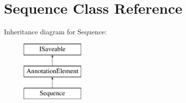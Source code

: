 \hypertarget{class_sequence}{}\section{Sequence Class Reference}
\label{class_sequence}
Inheritance diagram for Sequence\+:\begin{figure}[H]
\begin{center}
\leavevmode
\includegraphics[height=3.000000cm]{class_sequence}
\end{center}
\end{figure}
